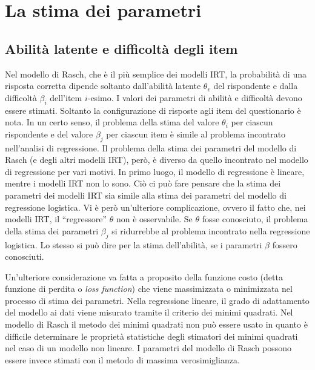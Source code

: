 \chapter{La stima dei parametri}
\label{chapter:stima_param_irt} 


\section{Abilità latente e difficoltà degli item}

Nel modello di Rasch, che è il più semplice dei modelli IRT, la probabilità di una risposta corretta dipende soltanto dall'abilità latente $\theta_v$ del rispondente e dalla difficoltà $\beta_i$ dell'item $i$-esimo. I valori dei parametri di abilità e difficoltà devono essere stimati. Soltanto la configurazione di risposte agli item del questionario è nota. In un certo senso, il problema della stima del valore $\theta_i$ per ciascun rispondente e del valore $\beta_j$ per ciascun item è simile
al problema incontrato nell'analisi di regressione. Il problema della
stima dei parametri del modello di Rasch (e degli altri modelli IRT), però, è diverso da quello incontrato nel modello di regressione per vari motivi.  In primo luogo, il modello di regressione è lineare, mentre i modelli IRT non lo sono. Ciò ci può fare pensare che la stima dei parametri dei modelli IRT sia simile alla stima dei parametri del modello di regressione logistica.  Vi è però un'ulteriore complicazione, ovvero il fatto che, nei modelli IRT, il ``regressore'' $\theta$ non è osservabile. Se $\theta$ fosse conosciuto, il problema della stima dei
parametri $\beta_j$ si ridurrebbe al problema incontrato nella regressione logistica. Lo stesso si può dire per la stima dell'abilità, se i parametri $\beta$
fossero conosciuti.

Un'ulteriore considerazione va fatta a proposito della funzione costo
(detta funzione di perdita o {\it loss function}) che viene
massimizzata o minimizzata nel processo di stima dei parametri.  Nella
regressione lineare, il grado di adattamento del modello ai dati viene
misurato tramite il criterio dei minimi quadrati.  Nel modello di
Rasch il metodo dei minimi quadrati non può essere usato in quanto è
difficile determinare le proprietà statistiche degli stimatori dei
minimi quadrati nel caso di un modello non lineare. I parametri del
modello di Rasch possono essere invece stimati con il metodo di massima
verosimiglianza.

